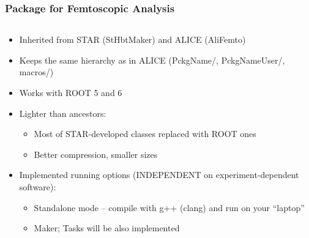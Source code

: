\documentclass[dvipsnames] {beamer}
\begin{document}
         \begin{frame}
        \bf
        \frametitle{\bf \centering Package for Femtoscopic Analysis}
        \vskip -0.8cm
        \begin{columns}[t]
          \begin{block}{\bf {}}
            \begin{itemize}
            \item \scriptsize Inherited from STAR (StHbtMaker) and ALICE (AliFemto)
            \item \scriptsize Keeps the same hierarchy as in ALICE (PckgName/, PckgNameUser/, macros/)
            \item \scriptsize Works with ROOT 5 and 6
            \item  \scriptsize Lighter than ancestors:
              \begin{itemize}
              \item \scriptsize Most of STAR-developed classes replaced with ROOT ones
              \item \scriptsize Better compression, smaller sizes
              \end{itemize}
            \item \scriptsize Implemented running options (INDEPENDENT on experiment-dependent software):
              \begin{itemize}
              \item \scriptsize Standalone mode – compile with g++ (clang) and run on your “laptop”
              \item \scriptsize Maker; Tasks will be also implemented
              \end{itemize}
            \end{itemize}
          \end{block}


\end{columns}
\end{frame}
\end{document}
